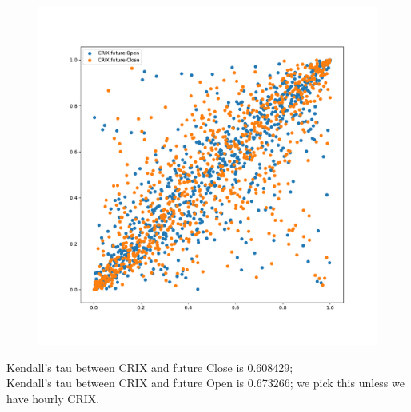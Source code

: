 \clearpage
\begin{figure}[ht]
    \centering
    \includegraphics[scale=.35]{_pics_notes/CRIX_future_Open_Close.pdf}
    \end{figure}

Kendall's tau between CRIX and future Close is 0.608429;\\
Kendall's tau between CRIX and future Open is 0.673266; we pick this unless we have hourly CRIX.
